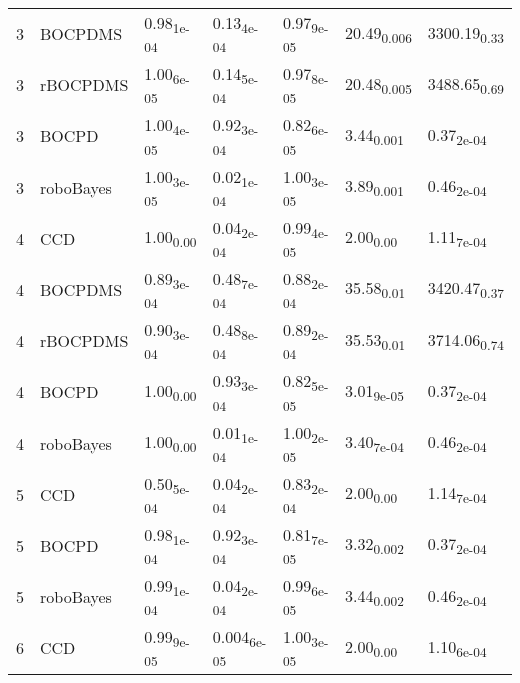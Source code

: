 \begin{table}[H]
\begin{tabular}{rllllll}
    3 & BOCPDMS & 0.98\textsubscript{1e-04} & 0.13\textsubscript{4e-04} & 0.97\textsubscript{9e-05} & 20.49\textsubscript{0.006} & 3300.19\textsubscript{0.33} \\ 
    3 & rBOCPDMS & 1.00\textsubscript{6e-05} & 0.14\textsubscript{5e-04} & 0.97\textsubscript{8e-05} & 20.48\textsubscript{0.005} & 3488.65\textsubscript{0.69} \\ 
    3 & BOCPD & 1.00\textsubscript{4e-05} & 0.92\textsubscript{3e-04} & 0.82\textsubscript{6e-05} & 3.44\textsubscript{0.001} & 0.37\textsubscript{2e-04} \\ 
    3 & roboBayes & 1.00\textsubscript{3e-05} & 0.02\textsubscript{1e-04} & 1.00\textsubscript{3e-05} & 3.89\textsubscript{0.001} & 0.46\textsubscript{2e-04} \\ 
   \hline
  4 & CCD & 1.00\textsubscript{0.00} & 0.04\textsubscript{2e-04} & 0.99\textsubscript{4e-05} & 2.00\textsubscript{0.00} & 1.11\textsubscript{7e-04} \\ 
    4 & BOCPDMS & 0.89\textsubscript{3e-04} & 0.48\textsubscript{7e-04} & 0.88\textsubscript{2e-04} & 35.58\textsubscript{0.01} & 3420.47\textsubscript{0.37} \\ 
    4 & rBOCPDMS & 0.90\textsubscript{3e-04} & 0.48\textsubscript{8e-04} & 0.89\textsubscript{2e-04} & 35.53\textsubscript{0.01} & 3714.06\textsubscript{0.74} \\ 
    4 & BOCPD & 1.00\textsubscript{0.00} & 0.93\textsubscript{3e-04} & 0.82\textsubscript{5e-05} & 3.01\textsubscript{9e-05} & 0.37\textsubscript{2e-04} \\ 
    4 & roboBayes & 1.00\textsubscript{0.00} & 0.01\textsubscript{1e-04} & 1.00\textsubscript{2e-05} & 3.40\textsubscript{7e-04} & 0.46\textsubscript{2e-04} \\ 
   \hline
  5 & CCD & 0.50\textsubscript{5e-04} & 0.04\textsubscript{2e-04} & 0.83\textsubscript{2e-04} & 2.00\textsubscript{0.00} & 1.14\textsubscript{7e-04} \\ 
    5 & BOCPD & 0.98\textsubscript{1e-04} & 0.92\textsubscript{3e-04} & 0.81\textsubscript{7e-05} & 3.32\textsubscript{0.002} & 0.37\textsubscript{2e-04} \\ 
    5 & roboBayes & 0.99\textsubscript{1e-04} & 0.04\textsubscript{2e-04} & 0.99\textsubscript{6e-05} & 3.44\textsubscript{0.002} & 0.46\textsubscript{2e-04} \\ 
   \hline
  6 & CCD & 0.99\textsubscript{9e-05} & 0.004\textsubscript{6e-05} & 1.00\textsubscript{3e-05} & 2.00\textsubscript{0.00} & 1.10\textsubscript{6e-04} \\ 

\end{tabular}
\end{table}
